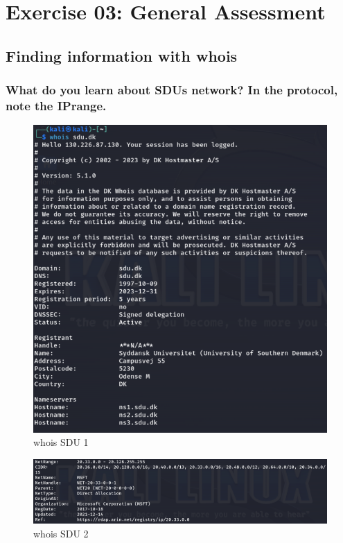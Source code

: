 \section{Exercise 03: General Assessment}
\subsection{Finding information with whois}


\subsubsection{What do you learn about SDUs network? In the protocol, note the IPrange.}

\begin{figure}[H]
    \centering
    \includegraphics[width=\linewidth]{pic/whois SDU 1.png}
    \caption{whois SDU 1}
    \label{fig:whois SDU 1}
\end{figure}

\begin{figure}[H]
    \centering
    \includegraphics[width=\linewidth]{pic/whois SDU 2.png}
    \caption{whois SDU 2}
    \label{fig:whois SDU 2}
\end{figure}


